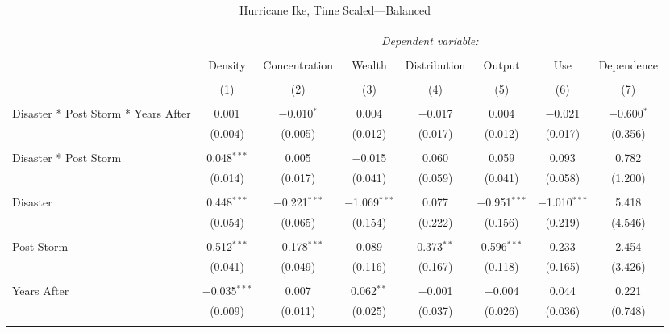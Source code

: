 
\begin{table}[!htbp] \centering 
  \caption{Hurricane Ike, Time Scaled---Balanced} 
  \label{} 
\footnotesize 
\begin{tabular}{@{\extracolsep{5pt}}lccccccc} 
\\[-1.8ex]\hline 
\hline \\[-1.8ex] 
 & \multicolumn{7}{c}{\textit{Dependent variable:}} \\ 
\cline{2-8} 
\\[-1.8ex] & Density & Concentration & Wealth & Distribution & Output & Use & Dependence \\ 
\\[-1.8ex] & (1) & (2) & (3) & (4) & (5) & (6) & (7)\\ 
\hline \\[-1.8ex] 
 Disaster * Post Storm * Years After & 0.001 & $-$0.010$^{*}$ & 0.004 & $-$0.017 & 0.004 & $-$0.021 & $-$0.600$^{*}$ \\ 
  & (0.004) & (0.005) & (0.012) & (0.017) & (0.012) & (0.017) & (0.356) \\ 
  & & & & & & & \\ 
 Disaster * Post Storm & 0.048$^{***}$ & 0.005 & $-$0.015 & 0.060 & 0.059 & 0.093 & 0.782 \\ 
  & (0.014) & (0.017) & (0.041) & (0.059) & (0.041) & (0.058) & (1.200) \\ 
  & & & & & & & \\ 
 Disaster & 0.448$^{***}$ & $-$0.221$^{***}$ & $-$1.069$^{***}$ & 0.077 & $-$0.951$^{***}$ & $-$1.010$^{***}$ & 5.418 \\ 
  & (0.054) & (0.065) & (0.154) & (0.222) & (0.156) & (0.219) & (4.546) \\ 
  & & & & & & & \\ 
 Post Storm & 0.512$^{***}$ & $-$0.178$^{***}$ & 0.089 & 0.373$^{**}$ & 0.596$^{***}$ & 0.233 & 2.454 \\ 
  & (0.041) & (0.049) & (0.116) & (0.167) & (0.118) & (0.165) & (3.426) \\ 
  & & & & & & & \\ 
 Years After & $-$0.035$^{***}$ & 0.007 & 0.062$^{**}$ & $-$0.001 & $-$0.004 & 0.044 & 0.221 \\ 
  & (0.009) & (0.011) & (0.025) & (0.037) & (0.026) & (0.036) & (0.748) \\ 
  & & & & & & & \\ 

\end{tabular}
\end{table}
